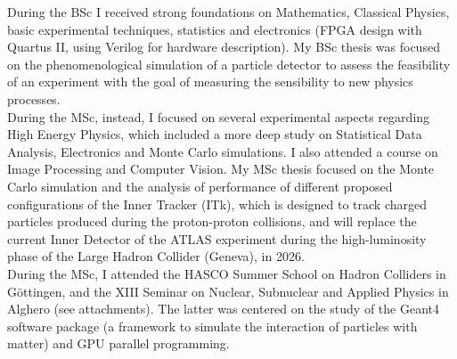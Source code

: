 \documentclass[a4paper,12pt]{article} %
\begin{document}




During the BSc I received strong foundations on Mathematics, Classical Physics, basic experimental
techniques, statistics and electronics (FPGA design with Quartus II, using Verilog for hardware
description). My BSc thesis was focused on the phenomenological simulation of a particle detector
to assess the feasibility of an experiment with the goal of measuring the sensibility to
new physics processes.\\

During the MSc, instead, I focused on several experimental aspects regarding High Energy Physics,
which included a more deep study on Statistical Data Analysis, Electronics and Monte Carlo simulations. I also attended a course on Image Processing and Computer Vision. My MSc
thesis focused on the Monte Carlo simulation and the analysis of performance of different proposed 
configurations of the Inner Tracker (ITk), which is designed to track charged particles produced during the proton-proton collisions, and will replace the current Inner Detector of the ATLAS experiment during the high-luminosity phase of the Large Hadron Collider (Geneva), in 2026. \\

During the MSc, I attended the HASCO Summer School on Hadron Colliders in Göttingen,  
 and the XIII Seminar on Nuclear, Subnuclear and Applied Physics in Alghero (see attachments). The latter was
 centered on the study of the Geant4 software package (a framework to simulate the
 interaction of particles with matter) and GPU parallel programming. \\


\Sep %
\end{document}
